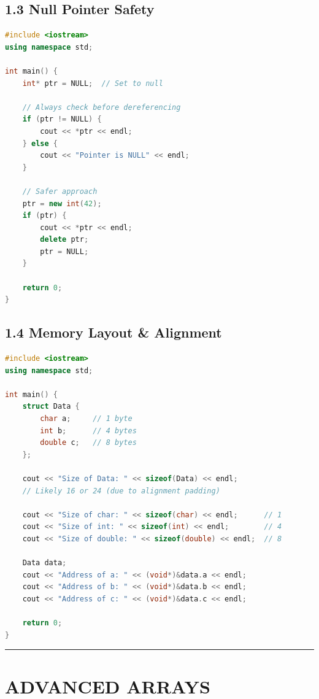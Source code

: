 \hypertarget{null-pointer-safety}{%
\section{1.3 Null Pointer Safety}\label{null-pointer-safety}}

\begin{lstlisting}[language={C++}]
#include <iostream>
using namespace std;

int main() {
    int* ptr = NULL;  // Set to null
    
    // Always check before dereferencing
    if (ptr != NULL) {
        cout << *ptr << endl;
    } else {
        cout << "Pointer is NULL" << endl;
    }
    
    // Safer approach
    ptr = new int(42);
    if (ptr) {
        cout << *ptr << endl;
        delete ptr;
        ptr = NULL;
    }
    
    return 0;
}
\end{lstlisting}

\hypertarget{memory-layout-alignment}{%
\section{1.4 Memory Layout \& Alignment}\label{memory-layout-alignment}}

\begin{lstlisting}[language={C++}]
#include <iostream>
using namespace std;

int main() {
    struct Data {
        char a;     // 1 byte
        int b;      // 4 bytes
        double c;   // 8 bytes
    };
    
    cout << "Size of Data: " << sizeof(Data) << endl;
    // Likely 16 or 24 (due to alignment padding)
    
    cout << "Size of char: " << sizeof(char) << endl;      // 1
    cout << "Size of int: " << sizeof(int) << endl;        // 4
    cout << "Size of double: " << sizeof(double) << endl;  // 8
    
    Data data;
    cout << "Address of a: " << (void*)&data.a << endl;
    cout << "Address of b: " << (void*)&data.b << endl;
    cout << "Address of c: " << (void*)&data.c << endl;
    
    return 0;
}
\end{lstlisting}

\begin{center}\rule{0.5\linewidth}{0.5pt}\end{center}

\hypertarget{advanced-arrays}{%
\chapter{ADVANCED ARRAYS}\label{advanced-arrays}}

